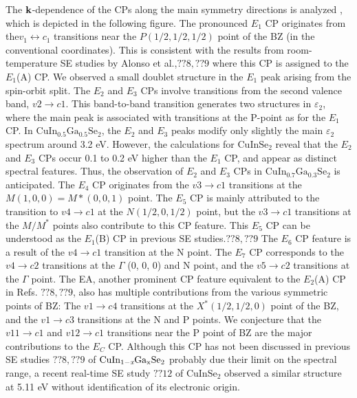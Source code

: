 \documentclass[a4paper, 12pt, titlepage,oneside,drop]{kthesis}
\begin{document}
The ${\textbf k}$-dependence of the CPs along the main symmetry directions is analyzed , which is depicted in the following figure. The pronounced $E_1$ CP originates from the$v_1 \leftrightarrow c_1$ transitions
 near the $P (1/2,1/2, 1/2)$ point of the BZ (in the conventional coordinates). This is consistent with the results from room-temperature SE studies by Alonso et al.,$??8,??9$ 
where this CP is assigned to the $E_1$(A) CP. We observed a small doublet structure in the $E_1$ peak arising from the spin-orbit split. The $E_2$ and $E_3$ CPs involve
 transitions from the second valence band, $v2 \longrightarrow c1$. This band-to-band transition generates two structures in $\varepsilon_2$, where the main peak is associated with transitions 
at the P-point as for the $E_1$ CP. In $\mathrm {CuIn_{0.5}Ga_{0.5}Se_2}$, the $E_2$ and $E_3$ peaks modify only slightly the main $\varepsilon_2$ spectrum around 3.2 eV. However, the calculations for 
$\mathrm {CuInSe_2}$ reveal that the $E_2$ and $E_3$ CPs occur 0.1 to 0.2 eV higher than the $E_1$ CP, and appear as distinct spectral features. Thus, the observation of $E_2$ and $E_3$ CPs in 
$\mathrm {CuIn_{0.7}Ga_{0.3}Se_2}$  is anticipated. The $E_4$ CP originates from the $v3 \longrightarrow c1$ transitions at the $M (1,0,0) = M* (0,0,1)$ point. The $E_5$ CP is mainly attributed to the 
transition to $v4 \longrightarrow c1$ at the $N (1/2, 0, 1/2)$ point, but the $v3 \longrightarrow c1$ transitions at the $M/M^*$ points also contribute to this CP feature. This $E_5$ CP can be understood as
 the $E_1$(B) CP in previous SE studies.$??8,??9$ The $E_6$ CP feature is a result of the $v4 \longrightarrow c1$ transition at the N point. The $E_7$ CP corresponds to the $v4 \longrightarrow c2$ transitions at
 the $\Gamma$ (0, 0, 0) and N point, and the $v5 \longrightarrow c2$ transitions at the $\Gamma$ point. The EA, another prominent CP feature equivalent to the $E_2$(A) CP in Refs. $??8,??9$, also has
 multiple contributions from the various symmetric points of BZ: The $v1 \longrightarrow c4$ transitions at the $X^* (1/2, 1/2, 0)$ point of the BZ, and the $v1 \longrightarrow c3$ transitions at the N
 and P points. We conjecture that the $v11 \longrightarrow c1$ and $v12 \longrightarrow c1$ transitions near the P point of BZ are the major contributions to the $E_C$ CP. Although this CP has not
 been discussed in previous SE studies $??8,??9$ of $\mathrm { CuIn_{1-\textit{x}}Ga_{x}Se_2}$ probably due their limit on the spectral range, a recent real-time SE study $??12$ of $\mathrm {CuInSe_2}$ observed a similar
 structure at 5.11 eV without identification of its electronic origin.
\end{document}
